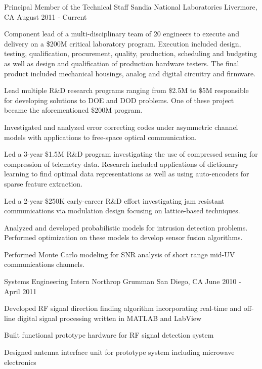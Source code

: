 \begin{cventries}
\cventry
{Principal Member of the Technical Staff} %
{Sandia National Laboratories} %
{Livermore, CA} %
{August 2011 - Current} %
{
  \begin{cvitems} %
    \item {Component lead of a multi-disciplinary team of 20 engineers to execute and delivery on a \$200M critical laboratory program. Execution included design, testing, qualification, procurement, quality, production, scheduling and budgeting as well as design and qualification of production hardware testers. The final product included mechanical housings, analog and digital circuitry and firmware.}
    \item {Lead multiple R\&D research programs ranging from \$2.5M to \$5M responsible for developing solutions to DOE and DOD problems. One of these project became the aforementioned \$200M program.}
    \item {Investigated and analyzed error correcting codes under asymmetric channel models with applications to free-space optical communication.}
    \item {Led a 3-year \$1.5M R\&D program investigating the use of compressed sensing for compression of telemetry data. Research included applications of dictionary learning to find optimal data representations as well as using auto-encoders for sparse feature extraction.}
    \item {Led a 2-year \$250K early-career R\&D effort investigating jam resistant communications via modulation design focusing on lattice-based techniques.}
    \item {Analyzed and developed probabilistic models for intrusion detection problems. Performed optimization on these models to develop sensor fusion algorithms.}
    \item {Performed Monte Carlo modeling for SNR analysis of short range mid-UV communications channels.}
  \end{cvitems}
}

\cventry
{Systems Engineering Intern} %
{Northrop Grumman} %
{San Diego, CA} %
{June 2010 - April 2011} %
{
  \begin{cvitems} %
    \item {Developed RF signal direction finding algorithm incorporating real-time and off-line digital signal processing written in MATLAB and LabView}
    \item {Built functional prototype hardware for RF signal detection system}
    \item {Designed antenna interface unit for prototype system including microwave electronics}
  \end{cvitems}
}


\end{cventries}
